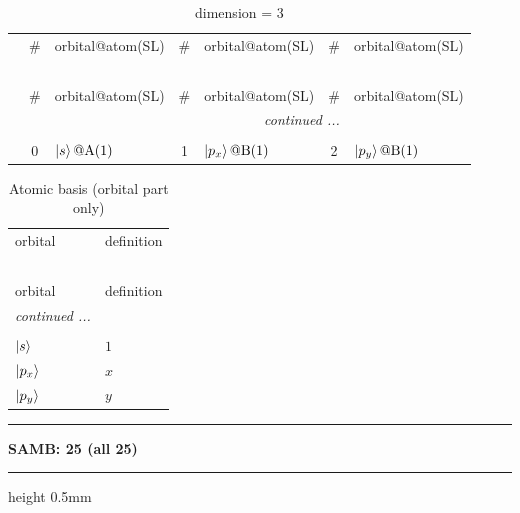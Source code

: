 \documentclass[fleqn,10pt,landscape]{jsarticle}
\begin{document}
\renewcommand{\arraystretch}{1.6}
\begin{longtable}[l]{c|cl|cl|cl}
\captionsetup{justification=raggedright, singlelinecheck=off}
\caption{dimension = 3}
 \\
 \hline \hline
 & \# & orbital@atom(SL) & \# & orbital@atom(SL) & \# & orbital@atom(SL) \\ \hline \endfirsthead

\multicolumn{6}{l}{\tablename\ \thetable{}} \\
 \hline \hline
 & \# & orbital@atom(SL) & \# & orbital@atom(SL) & \# & orbital@atom(SL) \\ \hline \endhead

 \hline \hline
\multicolumn{6}{r}{\footnotesize\it continued ...} \\ \endfoot

 \hline \hline
\multicolumn{6}{r}{} \\ \endlastfoot

 & 0 & $\ket{s}@{\rm A}(1)$ & 1 & $\ket{p_{x}}@{\rm B}(1)$ & 2 & $\ket{p_{y}}@{\rm B}(1)$ \\
\end{longtable}
\renewcommand{\arraystretch}{1.6}
\begin{longtable}[l]{ll}
\captionsetup{justification=raggedright, singlelinecheck=off}
\caption{Atomic basis (orbital part only)}
 \\
 \hline \hline
orbital & definition \\ \hline \endfirsthead

\multicolumn{1}{l}{\tablename\ \thetable{}} \\
 \hline \hline
orbital & definition \\ \hline \endhead

 \hline \hline
\multicolumn{1}{r}{\footnotesize\it continued ...} \\ \endfoot

 \hline \hline
\multicolumn{1}{r}{} \\ \endlastfoot

$ \ket{s} $ & $ 1 $ \\ \hline
$ \ket{p_{x}} $ & $ x $ \\
$ \ket{p_{y}} $ & $ y $ \\
\end{longtable}
\vspace{5mm}
\noindent \rule[0.5mm]{5mm}{0.5mm}\hspace{3mm}\textbf{SAMB: 25 (all 25)}\hspace{3mm}\leaders\hrule height 0.5mm\hfill\kern0pt
\vspace{3mm}
\end{document}
